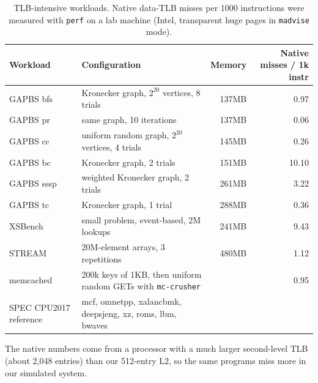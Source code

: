 \begin{table}[htbp]
\centering
\small
\caption{TLB-intensive workloads. Native data-TLB misses per 1000 instructions were measured with \texttt{perf} on a lab machine (Intel, transparent huge pages in \texttt{madvise} mode).}
\label{tab:workloads}
\begin{tabularx}{\textwidth}{l X r r}
\toprule
\textbf{Workload} & \textbf{Configuration} & \textbf{Memory} & \textbf{Native misses / 1k instr} \\
\midrule
GAPBS bfs~\cite{beamer2015gap} & Kronecker graph, $2^{20}$ vertices, 8 trials & 137MB & 0.97 \\
GAPBS pr & same graph, 10 iterations & 137MB & 0.06 \\
GAPBS cc & uniform random graph, $2^{20}$ vertices, 4 trials & 145MB & 0.26 \\
GAPBS bc & Kronecker graph, 2 trials & 151MB & 10.10 \\
GAPBS sssp & weighted Kronecker graph, 2 trials & 261MB & 3.22 \\
GAPBS tc & Kronecker graph, 1 trial & 288MB & 0.36 \\
XSBench~\cite{tramm2014xsbench} & small problem, event-based, 2M lookups & 241MB & 9.43 \\
STREAM~\cite{mccalpin1995stream} & 20M-element arrays, 3 repetitions & 480MB & 1.12 \\
memcached~\cite{memcached} & 200k keys of 1KB, then uniform random GETs with \texttt{mc-crusher} & & 0.95 \\
SPEC CPU2017 reference & mcf, omnetpp, xalancbmk, deepsjeng, xz, roms, lbm, bwaves & & \\
\bottomrule
\end{tabularx}
\end{table}

\noindent The native numbers come from a processor with a much larger second-level TLB (about 2,048 entries) than our 512-entry L2, so the same programs miss more in our simulated system.

